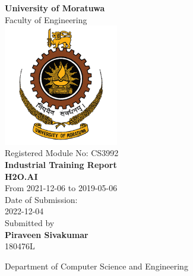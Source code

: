 \begin{titlepage}

\begin{center}
\pagecolor{orange}\afterpage{\nopagecolor}




\Large \textup{{\bf University of Moratuwa} \\ Faculty of Engineering }\\[0.7in]


        
\includegraphics[width=50mm]{download.png}\\[0.2in]

\textup{Registered Module No: CS3992}\\[0.2in]

\textup{{\bf Industrial Training Report} }\\[0.2in]

\Large \textup{{\bf H2O.AI} }\\[0.2in]

\textup{From 2021-12-06 to 2019-05-06}\\[0.2in]

\textup{Date of Submission: \\ 2022-12-04}\\[0.2in]

\normalsize Submitted by \\[0.2in]
\textbf{Piraveen Sivakumar}\\
180476L\\


\vspace{.3in}


\Large{Department of Computer Science and Engineering}\\

\end{center}

\end{titlepage}
